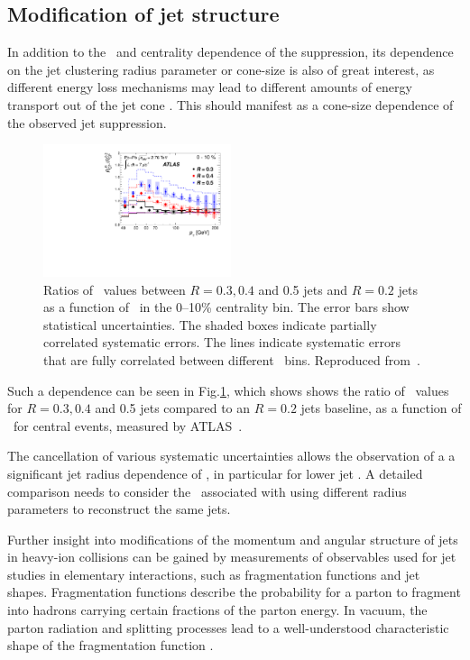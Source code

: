 \subsection{Modification of jet structure}

In addition to the \pT\ and centrality dependence of the suppression, its dependence on the 
jet clustering radius parameter or cone-size is also of great interest, as different energy loss 
mechanisms may lead to different amounts of energy transport out of the jet cone
\cite{Vitev:2008rz, Vitev:2009rd,He:2011pd}. This should manifest as a cone-size 
dependence of the observed jet suppression.
\begin{figure}[!h]
\begin{center}
\includegraphics[width=0.49\textwidth]{jetfigures/ATLAS_jetRCP_size.pdf}
\caption{
Ratios of \Rcp\ values between $R = 0.3, 0.4$ and 0.5 jets and $R =
0.2$ jets as a function of \pT\ in the 0--10\% centrality bin. The
error bars show statistical uncertainties. The shaded boxes
indicate partially correlated systematic errors. The lines indicate
systematic errors that are fully correlated between different \pT\ bins.
Reproduced from~\cite{Aad:2012is}.
}
\label{fig:GR:ATLAS_jetRCP_size}
\end{center}
\end{figure}

Such a dependence can be seen in Fig.\ref{fig:GR:ATLAS_jetRCP_size}, which shows 
shows the ratio of \Rcp\ values for $R = 0.3, 0.4$ and 0.5 jets compared
to an $R = 0.2$ jets baseline, as a function of \pT\ for central events,
measured by ATLAS~\cite{Aad:2012is}.

The cancellation of various systematic uncertainties allows the observation of a 
a significant jet radius dependence of \Rcp, in particular for
lower jet \pT. A detailed comparison needs to consider the \pT\ associated with
using different radius parameters to reconstruct the same jets.

Further insight into modifications of the momentum and angular structure
of jets in heavy-ion collisions can be gained by measurements of 
observables used for jet studies in elementary interactions, such as 
fragmentation functions and jet shapes.
Fragmentation functions describe the probability for a parton to fragment into
hadrons carrying certain fractions of the parton energy. 
In vacuum, the parton radiation and splitting processes lead to a
well-understood characteristic shape of the fragmentation function \cite{Dokshitzer:1991wu}.

